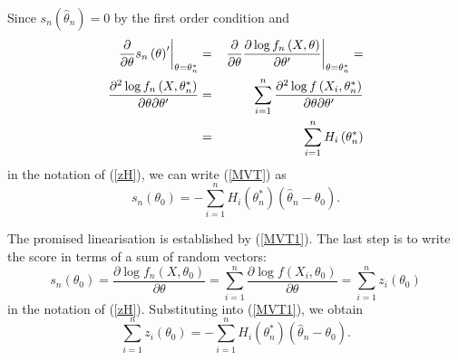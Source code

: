\documentclass[notes=show]{beamer}
\begin{document}
\begin{frame}%


Since $s_{n}\left( \hat{\theta}_{n}\right) =0$ by the first order condition
and%
\begin{eqnarray*}
\left. \frac{\partial }{\partial \theta }s_{n}\left( \theta \right) ^{\prime
}\right\vert _{\theta =\theta _{n}^{\ast }} &=&\left. \frac{\partial }{%
\partial \theta }\frac{\partial \log f_{n}\left( X,\theta \right) }{\partial
\theta ^{\prime }}\right\vert _{\theta =\theta _{n}^{\ast }}= \\
\frac{\partial ^{2}\log f_{n}\left( X,\theta _{n}^{\ast }\right) }{\partial
\theta \partial \theta ^{\prime }} &=&\sum_{i=1}^{n}\frac{\partial ^{2}\log
f\left( X_{i},\theta _{n}^{\ast }\right) }{\partial \theta \partial \theta
^{\prime }} \\
&=&\sum_{i=1}^{n}H_{i}\left( \theta _{n}^{\ast }\right) 
\end{eqnarray*}%
in the notation of (\ref{zH}), we can write (\ref{MVT}) as%
\begin{equation}
s_{n}\left( \theta _{0}\right) =-\sum_{i=1}^{n}H_{i}\left( \theta _{n}^{\ast
}\right) \left( \hat{\theta}_{n}-\theta _{0}\right) .  \label{MVT1}
\end{equation}

\end{frame}%

\begin{frame}%


The promised linearisation is established by (\ref{MVT1}). The last step is
to write the score in terms of a sum of random vectors:%
\begin{equation}
s_{n}\left( \theta _{0}\right) =\frac{\partial \log f_{n}\left( X,\theta
_{0}\right) }{\partial \theta }=\sum_{i=1}^{n}\frac{\partial \log f\left(
X_{i},\theta _{0}\right) }{\partial \theta }=\sum_{i=1}^{n}z_{i}\left(
\theta _{0}\right)   \label{Z}
\end{equation}%
in the notation of (\ref{zH}). Substituting into (\ref{MVT1}), we obtain%
\begin{equation}
\sum_{i=1}^{n}z_{i}\left( \theta _{0}\right) =-\sum_{i=1}^{n}H_{i}\left(
\theta _{n}^{\ast }\right) \left( \hat{\theta}_{n}-\theta _{0}\right) .
\label{MVT2}
\end{equation}

\end{frame}%
\end{document}
